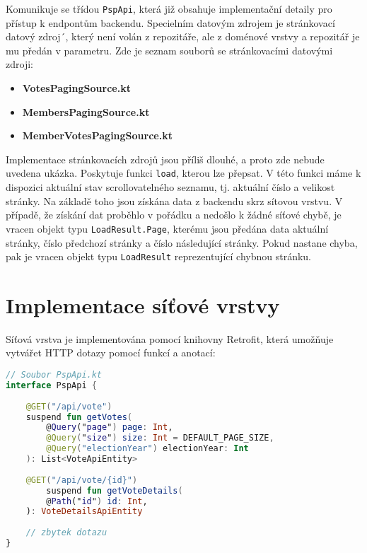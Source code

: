 \noindent Komunikuje se třídou \lstinline|PspApi|, která již obsahuje implementační detaily pro přístup k endpontům backendu. Specielním datovým zdrojem je stránkovací datový zdroj´, který není volán z repozitáře, ale z doménové vrstvy a repozitář je mu předán v parametru. Zde je seznam souborů se stránkovacími datovými zdroji:

\begin{itemize}
	\item \textbf{VotesPagingSource.kt}
	\item \textbf{MembersPagingSource.kt}
	\item \textbf{MemberVotesPagingSource.kt}
\end{itemize}

\noindent Implementace stránkovacích zdrojů jsou příliš dlouhé, a proto zde nebude uvedena ukázka. Poskytuje funkci \lstinline|load|, kterou lze přepsat. V této funkci máme k dispozici aktuální stav scrollovatelného seznamu, tj. aktuální číslo a velikost stránky. Na základě toho jsou získána data z backendu skrz sítovou vrstvu. V případě, že získání dat proběhlo v pořádku a nedošlo k žádné síťové chybě, je vracen objekt typu \lstinline|LoadResult.Page|, kterému jsou předána data aktuální stránky, číslo předchozí stránky a číslo následující stránky. Pokud nastane chyba, pak je vracen objekt typu \lstinline|LoadResult| reprezentující chybnou stránku.

\section{Implementace síťové vrstvy}
\label{sec:impl-network}

\noindent Síťová vrstva je implementována pomocí knihovny Retrofit, která umožňuje vytvářet HTTP dotazy pomocí funkcí a anotací:

\begin{lstlisting}[caption={Ukázka použití knihovny Retrofit pro získání seznamu hlasování z backendu}, label={lst:retrofit-votes}, tabsize=2, language=Kotlin]
// Soubor PspApi.kt
interface PspApi {
	
	@GET("/api/vote")
	suspend fun getVotes(
		@Query("page") page: Int,
		@Query("size") size: Int = DEFAULT_PAGE_SIZE,
		@Query("electionYear") electionYear: Int
	): List<VoteApiEntity>
	
	@GET("/api/vote/{id}")
		suspend fun getVoteDetails(
		@Path("id") id: Int,
	): VoteDetailsApiEntity
	
	// zbytek dotazu
}
\end{lstlisting}

